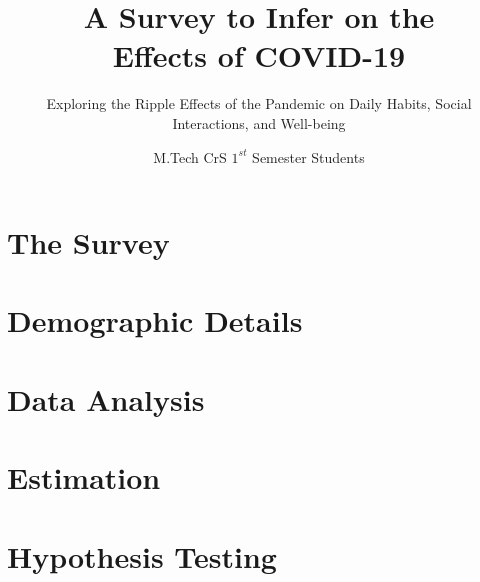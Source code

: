 \documentclass[english, msc, oneside]{layout/observatory-thesis}
\theoremstyle{definition}
\begin{document}
\title{\textbf{A Survey to Infer on the \\Effects of COVID-19}}
\subtitle{Exploring the Ripple Effects of the Pandemic on Daily Habits, Social Interactions, and Well-being} 
\subject{\thesistypeshort Project Report}
\author{M.Tech CrS $1^{st}$ Semester Students}
\address{Indian Statistical Institute, Kolkata 700108, India}


\frontmatter 

\makecover 
\maketitle 

\disclaimer


\tableofcontents

\mainmatter 

\chapter{The Survey}


\chapter{Demographic Details}


\chapter{Data Analysis}


\chapter{Estimation}


\chapter{Hypothesis Testing}





\end{document}
